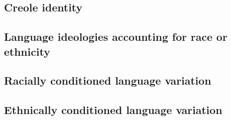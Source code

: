     \subsection{Creole identity}
    \subsection{Language ideologies accounting for race or ethnicity}
    \subsection{Racially conditioned language variation}
    \subsection{Ethnically conditioned language variation}
